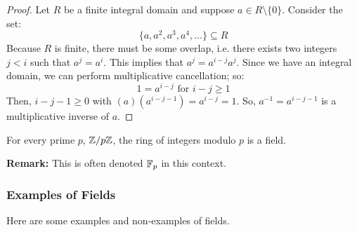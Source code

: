 \documentclass[letterpaper]{article}
\begin{document}
\begin{mdframed}[]
    \begin{proof}
        Let $R$ be a finite integral domain and suppose $a \in R \setminus \{0\}$. Consider the set: 
        \[\{a, a^2, a^3, a^4, \dots\} \subseteq R\]
        Because $R$ is finite, there must be some overlap, i.e. there exists two integers $j < i$ such that $a^j = a^i$. This implies that $a^j = a^{i - j} a^j$. Since we have an integral domain, we can perform multiplicative cancellation; so: 
        \[1 = a^{i - j} \text{ for } i - j \geq 1\]
        Then, $i - j - 1 \geq 0$ with $(a)(a^{i - j - 1}) = a^{i - j} = 1$. So, $a^{-1} = a^{i - j - 1}$ is a multiplicative inverse of $a$. 
    \end{proof}
\end{mdframed}


\begin{corollary}{}{}
    For every prime $p$, $\mathbb{Z} / p \mathbb{Z}$, the ring of integers modulo $p$ is a field.
\end{corollary}
\textbf{Remark:} This is often denoted $\mathbb{F}_p$ in this context. 

\subsubsection{Examples of Fields}
Here are some examples and non-examples of fields.
\end{document}
